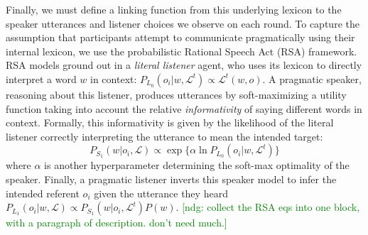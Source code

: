 \documentclass[10pt,letterpaper]{article}
\newcommand{\ndg}[1]{\textcolor{Green}{[ndg: #1]}}
\begin{document}

Finally, we must define a linking function from this underlying lexicon to the speaker utterances and listener choices we observe on each round. To capture the assumption that participants attempt to communicate pragmatically using their internal lexicon, we use the probabilistic Rational Speech Act (RSA) framework. RSA models ground out in a \emph{literal listener} agent, who uses its lexicon to directly interpret a word $w$ in context: $P_{L_0}(o_i | w, \mathcal{L}^t) \propto \mathcal{L}^t(w,o)$. A pragmatic speaker, reasoning about this listener, produces utterances by soft-maximizing a utility function taking into account the relative \emph{informativity} of saying different words in context. Formally, this informativity is given by the likelihood of the literal listener correctly interpreting the utterance to mean the intended target: $$P_{S_1}(w | o_i, \mathcal{L}) \propto \exp\{\alpha \ln P_{L_0}(o_i | w, \mathcal{L}^t)\}$$
where $\alpha$ is another hyperparameter determining the soft-max optimality of the speaker. Finally, a pragmatic listener inverts this speaker model to infer the intended referent $o_i$ given the utterance they heard $P_{L_1}(o_i | w, \mathcal{L}) \propto P_{S_1}(w | o_i, \mathcal{L}^t) P(w)$.
\ndg{collect the RSA eqs into one block, with a paragraph of description. don't need much.}

\end{document}

